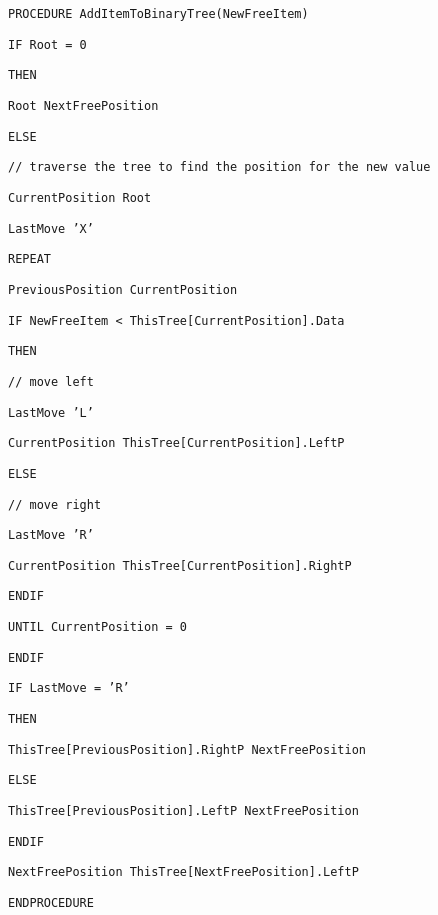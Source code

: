 \noindent %
\noindent\begin{minipage}[t]{1\columnwidth}%
\texttt{PROCEDURE AddItemToBinaryTree(NewFreeItem)}

\texttt{\qquad{}IF Root = 0}

\texttt{\qquad{}\qquad{}THEN}

\texttt{\qquad{}\qquad{}\qquad{}Root \textleftarrow{} NextFreePosition}

\texttt{\qquad{}\qquad{}ELSE}

\texttt{\qquad{}\qquad{}\qquad{}// traverse the tree to find the
position for the new value}

\texttt{\qquad{}\qquad{}\qquad{}CurrentPosition \textleftarrow{}
Root}

\texttt{\qquad{}\qquad{}\qquad{}LastMove \textleftarrow{} 'X'}

\texttt{\qquad{}\qquad{}\qquad{}REPEAT}

\texttt{\qquad{}\qquad{}\qquad{}\qquad{}PreviousPosition \textleftarrow{}
CurrentPosition}

\texttt{\qquad{}\qquad{}\qquad{}\qquad{}IF NewFreeItem < ThisTree{[}CurrentPosition{]}.Data}

\texttt{\qquad{}\qquad{}\qquad{}\qquad{}\qquad{}THEN}

\texttt{\qquad{}\qquad{}\qquad{}\qquad{}\qquad{}\qquad{}// move
left}

\texttt{\qquad{}\qquad{}\qquad{}\qquad{}\qquad{}\qquad{}LastMove
\textleftarrow{} 'L'}

\texttt{\qquad{}\qquad{}\qquad{}\qquad{}\qquad{}\qquad{}CurrentPosition
\textleftarrow{} ThisTree{[}CurrentPosition{]}.LeftP}

\texttt{\qquad{}\qquad{}\qquad{}\qquad{}\qquad{}ELSE}

\texttt{\qquad{}\qquad{}\qquad{}\qquad{}\qquad{}\qquad{}// move
right}

\texttt{\qquad{}\qquad{}\qquad{}\qquad{}\qquad{}\qquad{}LastMove
\textleftarrow{} 'R'}

\texttt{\qquad{}\qquad{}\qquad{}\qquad{}\qquad{}\qquad{}CurrentPosition
\textleftarrow{} ThisTree{[}CurrentPosition{]}.RightP}

\texttt{\qquad{}\qquad{}\qquad{}\qquad{}ENDIF}

\texttt{\qquad{}\qquad{}\qquad{}UNTIL CurrentPosition = 0}

\texttt{\qquad{}ENDIF}

\texttt{\qquad{}IF LastMove = 'R'}

\texttt{\qquad{}\qquad{}THEN}

\texttt{\qquad{}\qquad{}\qquad{}ThisTree{[}PreviousPosition{]}.RightP
\textleftarrow{} NextFreePosition}

\texttt{\qquad{}\qquad{}ELSE}

\texttt{\qquad{}\qquad{}\qquad{}ThisTree{[}PreviousPosition{]}.LeftP
\textleftarrow{} NextFreePosition}

\texttt{\qquad{}ENDIF}

\texttt{\qquad{}NextFreePosition ThisTree{[}NextFreePosition{]}.LeftP}

\texttt{ENDPROCEDURE}%
\end{minipage}

